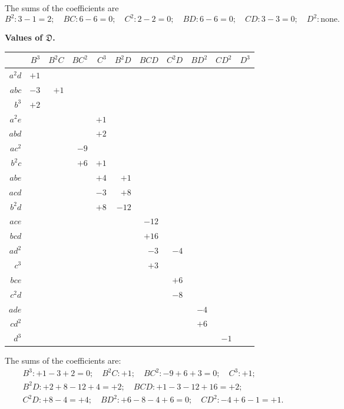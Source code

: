 \documentclass[11pt,a4paper]{book}
\begin{document}
The sums of the coefficients are
\[B^{2}: 3-1=2; \quad BC: 6-6=0; \quad C^{2}: 2-2=0; \quad BD: 6-6=0; \quad CD: 3-3=0; \quad D^{2}: \text{none.}\]

\newpage

\begin{center}
\renewcommand{\arraystretch}{1.2}
\textbf{Values of $\mathfrak{D}$.}
\begin{tabular}{r|rrrrrrrrrr}
& $B^{3}$ & $B^{2}C$ & $BC^{2}$ & $C^{3}$ & $B^{2}D$ & $BCD$ & $C^{2}D$ & $BD^{2}$ & $CD^{2}$ & $D^{3}$ \\
\hline
$a^{2}d$ & $+1$ \\
$abc$ & $-3$ & $+1$ \\
$b^{3}$ & $+2$ \\
$a^{2}e$ & & & & $+1$ \\
$abd$ & & & & $+2$ \\
$ac^{2}$ & & & $-9$ \\
$b^{2}c$ & & & $+6$ & $+1$ \\
$abe$ & & & & $+4$ & $+1$ \\
$acd$ & & & & $-3$ & $+8$ \\
$b^{2}d$ & & & & $+8$ & $-12$ \\
$ace$ & & & & & & $-12$ \\
$bcd$ & & & & & & $+16$ \\
$ad^{2}$ & & & & & & $-3$ & $-4$ \\
$c^{3}$ & & & & & & $+3$ \\
$bce$ & & & & & & & $+6$ \\
$c^{2}d$ & & & & & & & $-8$ \\
$ade$ & & & & & & & & $-4$ \\
$cd^{2}$ & & & & & & & & $+6$ \\
$d^{3}$ & & & & & & & & & $-1$
\end{tabular}
\end{center}

The sums of the coefficients are:
\begin{gather*}
B^{3}: +1-3+2=0; \quad B^{2}C: +1; \quad BC^{2}: -9+6+3=0; \quad C^{3}: +1; \\
B^{2}D: +2+8-12+4=+2; \quad BCD: +1-3-12+16=+2; \\
C^{2}D: +8-4=+4; \quad BD^{2}: +6-8-4+6=0; \quad CD^{2}: -4+6-1=+1.
\end{gather*}

\newpage
\end{document}
